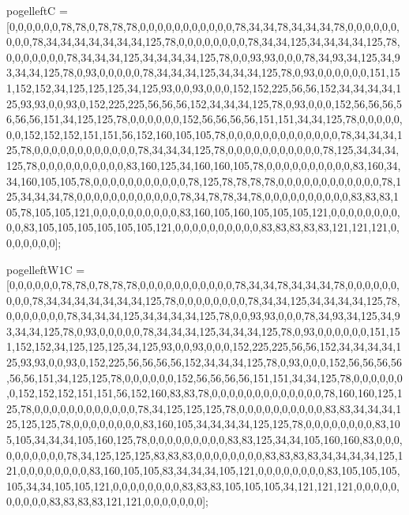 pogelleftC = [0,0,0,0,0,0,78,78,0,78,78,78,0,0,0,0,0,0,0,0,0,0,0,78,34,34,78,34,34,34,78,0,0,0,0,0,0,0,0,0,78,34,34,34,34,34,34,34,125,78,0,0,0,0,0,0,0,0,78,34,34,125,34,34,34,34,125,78,0,0,0,0,0,0,0,78,34,34,34,125,34,34,34,34,125,78,0,0,93,93,0,0,0,78,34,93,34,125,34,93,34,34,125,78,0,93,0,0,0,0,0,78,34,34,34,125,34,34,34,125,78,0,93,0,0,0,0,0,0,151,151,152,152,34,125,125,125,34,125,93,0,0,93,0,0,0,152,152,225,56,56,152,34,34,34,34,125,93,93,0,0,93,0,152,225,225,56,56,56,152,34,34,34,125,78,0,93,0,0,0,152,56,56,56,56,56,56,151,34,125,125,78,0,0,0,0,0,0,152,56,56,56,56,151,151,34,34,125,78,0,0,0,0,0,0,0,152,152,152,151,151,56,152,160,105,105,78,0,0,0,0,0,0,0,0,0,0,0,0,0,78,34,34,34,125,78,0,0,0,0,0,0,0,0,0,0,0,0,78,34,34,34,125,78,0,0,0,0,0,0,0,0,0,0,0,78,125,34,34,34,125,78,0,0,0,0,0,0,0,0,0,0,83,160,125,34,160,160,105,78,0,0,0,0,0,0,0,0,0,0,83,160,34,34,160,105,105,78,0,0,0,0,0,0,0,0,0,0,0,78,125,78,78,78,78,0,0,0,0,0,0,0,0,0,0,0,0,78,125,34,34,34,78,0,0,0,0,0,0,0,0,0,0,0,0,78,34,78,78,34,78,0,0,0,0,0,0,0,0,0,0,83,83,83,105,78,105,105,121,0,0,0,0,0,0,0,0,0,0,83,160,105,160,105,105,105,121,0,0,0,0,0,0,0,0,0,0,83,105,105,105,105,105,105,121,0,0,0,0,0,0,0,0,0,0,83,83,83,83,83,121,121,121,0,0,0,0,0,0,0];

pogelleftW1C = [0,0,0,0,0,0,78,78,0,78,78,78,0,0,0,0,0,0,0,0,0,0,0,78,34,34,78,34,34,34,78,0,0,0,0,0,0,0,0,0,78,34,34,34,34,34,34,34,125,78,0,0,0,0,0,0,0,0,78,34,34,125,34,34,34,34,125,78,0,0,0,0,0,0,0,78,34,34,34,125,34,34,34,34,125,78,0,0,93,93,0,0,0,78,34,93,34,125,34,93,34,34,125,78,0,93,0,0,0,0,0,78,34,34,34,125,34,34,34,125,78,0,93,0,0,0,0,0,0,151,151,152,152,34,125,125,125,34,125,93,0,0,93,0,0,0,152,225,225,56,56,152,34,34,34,34,125,93,93,0,0,93,0,152,225,56,56,56,56,152,34,34,34,125,78,0,93,0,0,0,152,56,56,56,56,56,56,151,34,125,125,78,0,0,0,0,0,0,152,56,56,56,56,151,151,34,34,125,78,0,0,0,0,0,0,0,152,152,152,151,151,56,152,160,83,83,78,0,0,0,0,0,0,0,0,0,0,0,0,0,78,160,160,125,125,78,0,0,0,0,0,0,0,0,0,0,0,0,78,34,125,125,125,78,0,0,0,0,0,0,0,0,0,0,83,83,34,34,34,125,125,125,78,0,0,0,0,0,0,0,0,83,160,105,34,34,34,34,125,125,78,0,0,0,0,0,0,0,0,83,105,105,34,34,34,105,160,125,78,0,0,0,0,0,0,0,0,0,83,83,125,34,34,105,160,160,83,0,0,0,0,0,0,0,0,0,0,78,34,125,125,125,83,83,83,0,0,0,0,0,0,0,0,83,83,83,83,34,34,34,34,125,121,0,0,0,0,0,0,0,0,83,160,105,105,83,34,34,34,105,121,0,0,0,0,0,0,0,0,83,105,105,105,105,34,34,105,105,121,0,0,0,0,0,0,0,0,83,83,83,105,105,105,34,121,121,121,0,0,0,0,0,0,0,0,0,0,83,83,83,83,121,121,0,0,0,0,0,0,0];

